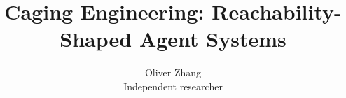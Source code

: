 \documentclass[10pt,twocolumn]{article}
\title{Caging Engineering: Reachability-Shaped Agent Systems}
\author{Oliver Zhang\\Independent researcher}
\date{}
\begin{document}
\maketitle

\begin{abstract}

\end{abstract}









\label{end:body}
\renewcommand{\bibfont}{\small}



\clearpage
\onecolumn
\appendix



\end{document}
